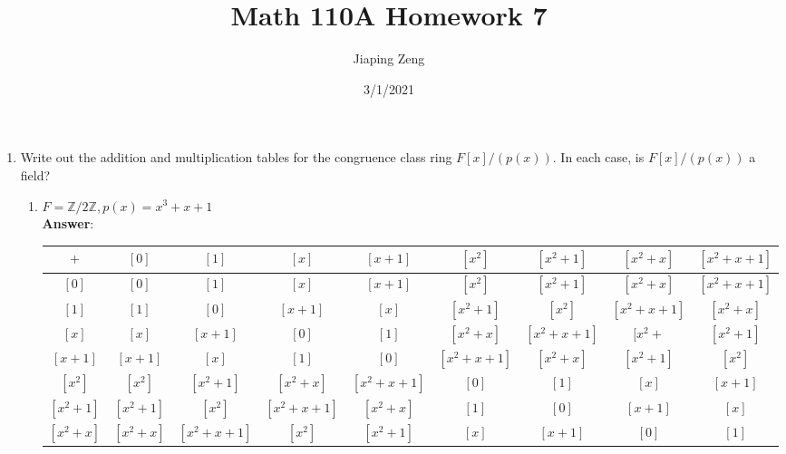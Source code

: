 \documentclass{article}
\title{Math 110A Homework 7}
\date{3/1/2021}
\author{Jiaping Zeng}
\begin{document}
\maketitle

\begin{enumerate}
      \item Write out the addition and multiplication tables for the congruence class ring $F[x]/(p(x))$. In each case, is $F[x]/(p(x))$ a field?
            \begin{enumerate}
                  \item $F=\mathbb{Z}/2\mathbb{Z},p(x)=x^3+x+1$\\
                        \textbf{Answer}:
                        \begin{adjustwidth}{-1in}{-1in}
                              \begin{center}
                                    \begin{tabular}{c|c c c c c c c c}
                                          $+$         & $[0]$       & $[1]$       & $[x]$       & $[x+1]$     & $[x^2]$     & $[x^2+1]$   & $[x^2+x]$   & $[x^2+x+1]$ \\
                                          \hline
                                          $[0]$       & $[0]$       & $[1]$       & $[x]$       & $[x+1]$     & $[x^2]$     & $[x^2+1]$   & $[x^2+x]$   & $[x^2+x+1]$ \\
                                          $[1]$       & $[1]$       & $[0]$       & $[x+1]$     & $[x]$       & $[x^2+1]$   & $[x^2]$     & $[x^2+x+1]$ & $[x^2+x]$   \\
                                          $[x]$       & $[x]$       & $[x+1]$     & $[0]$       & $[1]$       & $[x^2+x]$   & $[x^2+x+1]$ & $[x^2+$     & $[x^2+1]$   \\
                                          $[x+1]$     & $[x+1]$     & $[x]$       & $[1]$       & $[0]$       & $[x^2+x+1]$ & $[x^2+x]$   & $[x^2+1]$   & $[x^2]$     \\
                                          $[x^2]$     & $[x^2]$     & $[x^2+1]$   & $[x^2+x]$   & $[x^2+x+1]$ & $[0]$       & $[1]$       & $[x]$       & $[x+1]$     \\
                                          $[x^2+1]$   & $[x^2+1]$   & $[x^2]$     & $[x^2+x+1]$ & $[x^2+x]$   & $[1]$       & $[0]$       & $[x+1]$     & $[x]$       \\
                                          $[x^2+x]$   & $[x^2+x]$   & $[x^2+x+1]$ & $[x^2]$     & $[x^2+1]$   & $[x]$       & $[x+1]$     & $[0]$       & $[1]$       \\

\end{tabular}
\end{center}
\end{adjustwidth}
\end{enumerate}
\end{enumerate}
\end{document}
